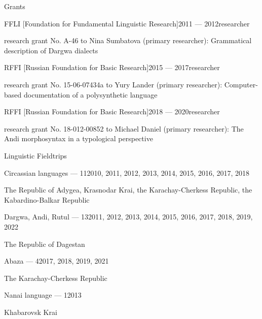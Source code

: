 \documentclass{resume} %
\begin{document}
\begin{rSection}{Grants}
\begin{rSubsection}{FFLI [Foundation for Fundamental Linguistic Research]}{2011 --- 2012}{researcher}{}
\item research grant No. A-46 to Nina Sumbatova (primary researcher): Grammatical description of Dargwa dialects
\end{rSubsection}
\begin{rSubsection}{RFFI [Russian Foundation for Basic Research]}{2015 --- 2017}{researcher}{}
\item research grant No. 15-06-07434a to Yury Lander (primary researcher): Computer-based documentation of a polysynthetic language
\end{rSubsection}
\begin{rSubsection}{RFFI [Russian Foundation for Basic Research]}{2018 --- 2020}{researcher}{}
\item research grant No. 18-012-00852 to Michael Daniel (primary researcher): The Andi morphosyntax in a typological perspective
\end{rSubsection}
\end{rSection}

\begin{rSection}{Linguistic Fieldtrips}

\begin{rSubsection}{Circassian languages --- 11}{2010, 2011, 2012, 2013, 2014, 2015, 2016, 2017, 2018}{}{}
\item The Republic of Adygea, Krasnodar Krai, the Karachay-Cherkess Republic, the Kabardino-Balkar Republic
\end{rSubsection}
\begin{rSubsection}{Dargwa, Andi, Rutul --- 13}{2011, 2012, 2013, 2014, 2015, 2016, 2017, 2018, 2019, 2022}{}{}
\item The Republic of Dagestan
\end{rSubsection}
\begin{rSubsection}{Abaza --- 4}{2017, 2018, 2019, 2021}{}{}
\item The Karachay-Cherkess Republic
\end{rSubsection}
\begin{rSubsection}{Nanai language --- 1}{2013}{}{}
\item Khabarovsk Krai
\end{rSubsection}
\end{rSection}

\end{document}
